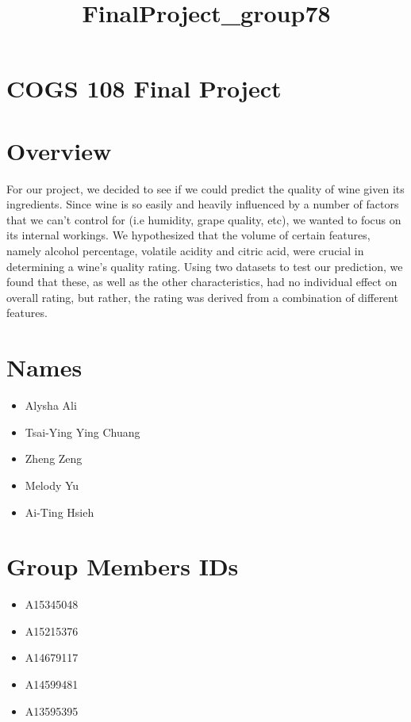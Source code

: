 \documentclass[11pt]{article}
\title{FinalProject\_group78}
\providecommand{\tightlist}{%
      \setlength{\itemsep}{0pt}\setlength{\parskip}{0pt}}
\begin{document}
    
    
    \maketitle
    
    

    
    \section{COGS 108 Final Project}\label{cogs-108-final-project}

    \section{Overview}\label{overview}

    For our project, we decided to see if we could predict the quality of
wine given its ingredients. Since wine is so easily and heavily
influenced by a number of factors that we can't control for (i.e
humidity, grape quality, etc), we wanted to focus on its internal
workings. We hypothesized that the volume of certain features, namely
alcohol percentage, volatile acidity and citric acid, were crucial in
determining a wine's quality rating. Using two datasets to test our
prediction, we found that these, as well as the other characteristics,
had no individual effect on overall rating, but rather, the rating was
derived from a combination of different features.

    \section{Names}\label{names}

\begin{itemize}
\tightlist
\item
  Alysha Ali
\item
  Tsai-Ying Ying Chuang
\item
  Zheng Zeng
\item
  Melody Yu
\item
  Ai-Ting Hsieh
\end{itemize}

    \section{Group Members IDs}\label{group-members-ids}

\begin{itemize}
\tightlist
\item
  A15345048
\item
  A15215376
\item
  A14679117
\item
  A14599481
\item
  A13595395
\end{itemize}
\end{document}
